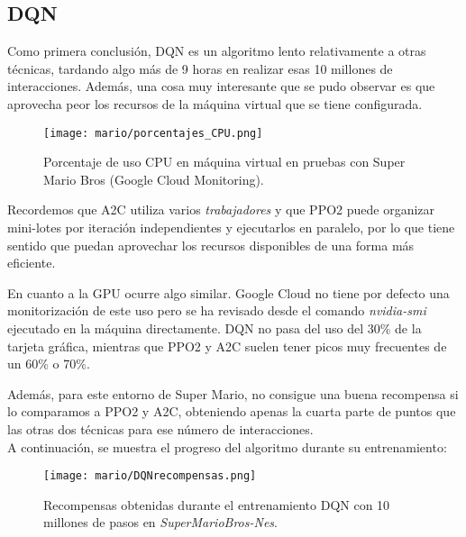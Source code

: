 \documentclass[11pt,fleqn]{book} %
\begin{document}
\subsection{DQN}

Como primera conclusión, DQN es un algoritmo lento relativamente a otras técnicas, tardando algo más de 9 horas en realizar esas 10 millones de interacciones. Además, una cosa muy interesante que se pudo observar es que aprovecha peor los recursos de la máquina virtual que se tiene configurada.

\begin{figure}[H]
	\centering\texttt{[image: mario/porcentajes\_CPU.png]}
	\caption{Porcentaje de uso CPU en máquina virtual en pruebas con Super Mario Bros (Google Cloud Monitoring).}
	\label{fig:usoCPU} %
\end{figure}

Recordemos que A2C utiliza varios \textit{trabajadores} y que PPO2 puede organizar mini-lotes por iteración independientes y ejecutarlos en paralelo, por lo que tiene sentido que puedan aprovechar los recursos disponibles de una forma más eficiente.

En cuanto a la GPU ocurre algo similar. Google Cloud no tiene por defecto una monitorización de este uso pero se ha revisado desde el comando \textit{nvidia-smi} ejecutado en la máquina directamente. DQN no pasa del uso del 30\% de la tarjeta gráfica, mientras que PPO2 y A2C suelen tener picos muy frecuentes de un 60\% o 70\%.

Además, para este entorno de Super Mario, no consigue una buena recompensa si lo comparamos a PPO2 y A2C, obteniendo apenas la cuarta parte de puntos que las otras dos técnicas para ese número de interacciones. \\

A continuación, se muestra el progreso del algoritmo durante su entrenamiento:

\begin{figure}[H]
	\centering\texttt{[image: mario/DQNrecompensas.png]}
	\caption{Recompensas obtenidas durante el entrenamiento DQN con 10 millones de pasos en \textit{SuperMarioBros-Nes}.}
	\label{fig:marioDQNrecompensas} %
\end{figure}
\end{document}
